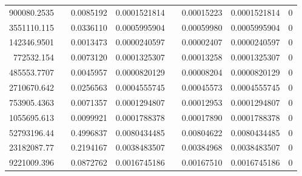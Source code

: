 \documentclass[
journal=jacsat, %
manuscript=article]{achemso}
\begin{document}
\begin{table}[htbp]
{\begin{tabular}{rrrrrrrr}
    900080.2535 &       & 0.0085192 & 0.0001521814 &       & 0.00015223 & 0.0001521814 & 0 \\
    3551110.115 &       & 0.0336110 & 0.0005995904 &       & 0.00059980 & 0.0005995904 & 0 \\
    142346.9501 &       & 0.0013473 & 0.0000240597 &       & 0.00002407 & 0.0000240597 & 0 \\
    772532.154 &       & 0.0073120 & 0.0001325307 &       & 0.00013258 & 0.0001325307 & 0 \\
    485553.7707 &       & 0.0045957 & 0.0000820129 &       & 0.00008204 & 0.0000820129 & 0 \\
    2710670.642 &       & 0.0256563 & 0.0004555745 &       & 0.00045573 & 0.0004555745 & 0 \\
    753905.4363 &       & 0.0071357 & 0.0001294807 &       & 0.00012953 & 0.0001294807 & 0 \\
    1055695.613 &       & 0.0099921 & 0.0001788378 &       & 0.00017890 & 0.0001788378 & 0 \\
    52793196.44 &       & 0.4996837 & 0.0080434485 &       & 0.00804622 & 0.0080434485 & 0 \\
    23182087.77 &       & 0.2194167 & 0.0038483507 &       & 0.00384968 & 0.0038483507 & 0 \\
    9221009.396 &       & 0.0872762 & 0.0016745186 &       & 0.00167510 & 0.0016745186 & 0 \\
    \bottomrule
    \end{tabular}%
    }
  \label{tab:addlabel}%
\end{table}%
\end{document}
